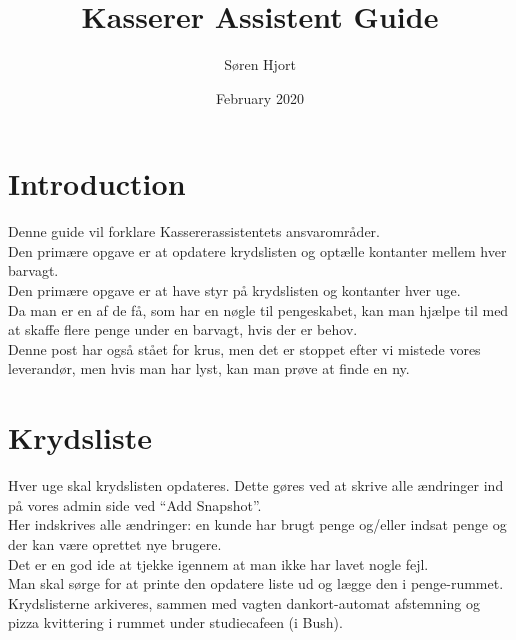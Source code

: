 

\title{Kasserer Assistent Guide}
\author{Søren Hjort}
\date{February 2020}



\maketitle

\section{Introduction}
Denne guide vil forklare Kassererassistentets ansvarområder.
\\
Den primære opgave er at opdatere krydslisten og optælle kontanter mellem hver
barvagt.
\\
Den primære opgave er at have styr på krydslisten og kontanter hver uge.
\\
Da man er en af de få, som har en nøgle til pengeskabet, kan man hjælpe til med at
skaffe flere penge under en barvagt, hvis der er behov.
\\
Denne post har også stået for krus, men det er stoppet efter vi mistede vores
leverandør, men hvis man har lyst, kan man prøve at finde en ny. 

\section{Krydsliste}
Hver uge skal krydslisten opdateres. Dette gøres ved at skrive alle ændringer
ind på vores admin side ved ``Add Snapshot''.
\\
Her indskrives alle ændringer: en kunde har brugt penge og/eller indsat penge og
der kan være oprettet nye brugere.
\\
Det er en god ide at tjekke igennem at man ikke har lavet nogle fejl.
\\
Man skal sørge for at printe den opdatere liste ud og lægge den i penge-rummet. 
\\
Krydslisterne arkiveres, sammen med vagten dankort-automat afstemning og pizza
kvittering i rummet under studiecafeen (i Bush).

